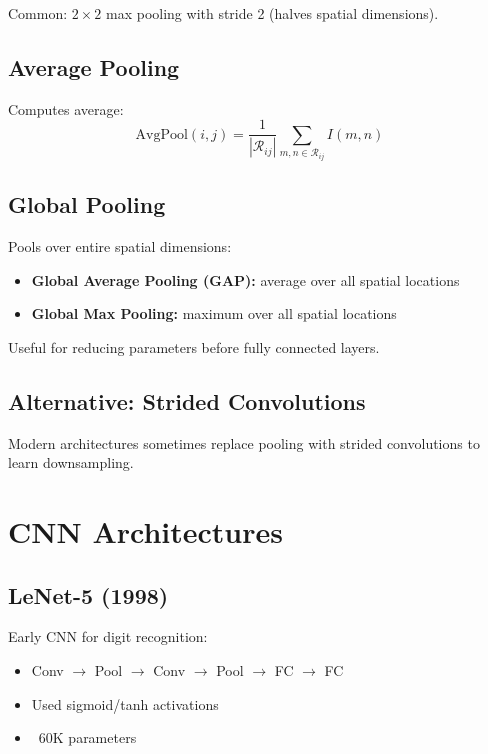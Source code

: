 Common: $2 \times 2$ max pooling with stride 2 (halves spatial dimensions).

\subsection{Average Pooling}

Computes average:
\begin{equation}
\text{AvgPool}(i,j) = \frac{1}{|\mathcal{R}_{ij}|} \sum_{m,n \in \mathcal{R}_{ij}} I(m,n)
\end{equation}

\subsection{Global Pooling}

Pools over entire spatial dimensions:
\begin{itemize}
    \item \textbf{Global Average Pooling (GAP):} average over all spatial locations
    \item \textbf{Global Max Pooling:} maximum over all spatial locations
\end{itemize}

Useful for reducing parameters before fully connected layers.

\subsection{Alternative: Strided Convolutions}

Modern architectures sometimes replace pooling with strided convolutions to learn downsampling.

\section{CNN Architectures}
\label{sec:cnn-architectures}

\subsection{LeNet-5 (1998)}

Early CNN for digit recognition:
\begin{itemize}
    \item Conv $\to$ Pool $\to$ Conv $\to$ Pool $\to$ FC $\to$ FC
    \item Used sigmoid/tanh activations
    \item ~60K parameters
\end{itemize}

